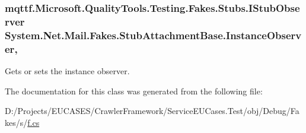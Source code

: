 \hypertarget{class_system_1_1_net_1_1_mail_1_1_fakes_1_1_stub_attachment_base_a9329fd7f17dee24b335c79ca51588fb5}{
\subsubsection[{Instance\-Observer}]{\setlength{\rightskip}{0pt plus 5cm}mqttf.\-Microsoft.\-Quality\-Tools.\-Testing.\-Fakes.\-Stubs.\-I\-Stub\-Observer System.\-Net.\-Mail.\-Fakes.\-Stub\-Attachment\-Base.\-Instance\-Observer\hspace{0.3cm}{\ttfamily [get]}, {\ttfamily [set]}}}\label{class_system_1_1_net_1_1_mail_1_1_fakes_1_1_stub_attachment_base_a9329fd7f17dee24b335c79ca51588fb5}


Gets or sets the instance observer.



The documentation for this class was generated from the following file\-:\begin{DoxyCompactItemize}
\item 
D\-:/\-Projects/\-E\-U\-C\-A\-S\-E\-S/\-Crawler\-Framework/\-Service\-E\-U\-Cases.\-Test/obj/\-Debug/\-Fakes/s/\hyperlink{s_2f_8cs}{f.\-cs}\end{DoxyCompactItemize}
